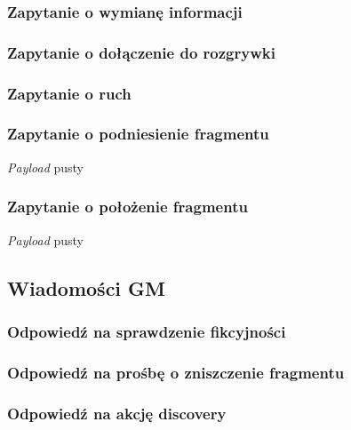 \documentclass[Dokumentacja.tex]{subfiles}
\begin{document}
\subsubsection{Zapytanie o wymianę informacji}


\subsubsection{Zapytanie o dołączenie do rozgrywki}


\subsubsection{Zapytanie o ruch}


\subsubsection{Zapytanie o podniesienie fragmentu}
\textit{Payload} pusty


\subsubsection{Zapytanie o położenie fragmentu}
\textit{Payload} pusty



\subsection{Wiadomości GM}
\subsubsection{Odpowiedź na sprawdzenie fikcyjności}


\subsubsection{Odpowiedź na prośbę o zniszczenie fragmentu}


\subsubsection{Odpowiedź na akcję discovery}

\end{document}

